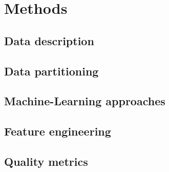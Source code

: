 \chapter{Methods}
\label{cha:Methods}


\section{Data description}



\section{Data partitioning}


\section{Machine-Learning approaches}


\section{Feature engineering}


\section{Quality metrics}
